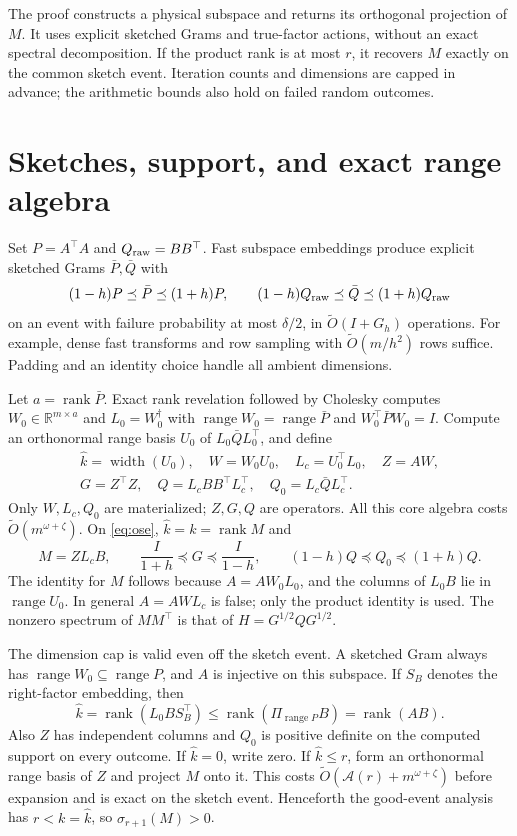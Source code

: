 \documentclass[11pt]{article}
\newcommand{\R}{\mathbb R}
\newcommand{\rank}{\operatorname{rank}}
\newcommand{\range}{\operatorname{range}}
\newcommand{\tO}{\widetilde O}
\newcommand{\Ac}{\mathcal A}
\begin{document}
The proof constructs a physical subspace and returns its orthogonal
projection of \(M\). It uses explicit sketched Grams and true-factor
actions, without an exact spectral decomposition. If the product rank is at most \(r\),
it recovers \(M\) exactly on the common sketch event. Iteration counts
and dimensions are capped in advance; the arithmetic bounds also hold
on failed random outcomes.

\section{Sketches, support, and exact range algebra}
Set \(P=A^\top A\) and \(Q_{\rm raw}=BB^\top\). Fast subspace embeddings
\cite{cnw} produce explicit sketched Grams \(\bar P,\bar Q\) with
\begin{equation}\label{eq:ose}
 (1-h)P\preceq\bar P\preceq(1+h)P,\qquad
 (1-h)Q_{\rm raw}\preceq\bar Q\preceq(1+h)Q_{\rm raw}
\end{equation}
on an event with failure probability at most \(\delta/2\), in
\(\tO(I+G_h)\) operations. For example, dense fast transforms and
row sampling with \(\tO(m/h^2)\) rows suffice. Padding and an identity
choice handle all ambient dimensions.

Let \(a=\rank\bar P\). Exact rank revelation followed by Cholesky
computes \(W_0\in\R^{m\times a}\) and \(L_0=W_0^\dagger\) with
\(\range W_0=\range\bar P\) and \(W_0^\top\bar P W_0=I\).
Compute an orthonormal range basis \(U_0\) of
\(L_0\bar QL_0^\top\), and define
\begin{gather*}
 \widehat k=\operatorname{width}(U_0),\quad
 W=W_0U_0,\quad L_c=U_0^\top L_0,\quad Z=AW,\\
 G=Z^\top Z,\quad Q=L_cBB^\top L_c^\top,\quad Q_0=L_c\bar QL_c^\top.
\end{gather*}
Only \(W,L_c,Q_0\) are materialized; \(Z,G,Q\) are operators.
All this core algebra costs \(\tO(m^{\omega+\zeta})\).
On \eqref{eq:ose}, \(\widehat k=k=\rank M\) and
\begin{equation}\label{eq:support}
 M=ZL_cB,\qquad
 \frac{I}{1+h}\preceq G\preceq\frac{I}{1-h},\qquad
 (1-h)Q\preceq Q_0\preceq(1+h)Q.
\end{equation}
The identity for \(M\) follows because \(A=AW_0L_0\), and the columns
of \(L_0B\) lie in \(\range U_0\). In general \(A=AWL_c\) is false;
only the product identity is used. The nonzero spectrum of \(MM^\top\)
is that of \(H=G^{1/2}QG^{1/2}\).

The dimension cap is valid even off the sketch event. A sketched Gram
always has \(\range W_0\subseteq\range P\), and \(A\) is injective
on this subspace. If \(S_B\) denotes the right-factor embedding, then
\[
 \widehat k=\rank(L_0B S_B^\top)
       \leq\rank(\Pi_{\range P}B)=\rank(AB).
\]
Also \(Z\) has independent columns and \(Q_0\) is positive definite
on the computed support on every outcome. If \(\widehat k=0\), write
zero. If \(\widehat k\leq r\), form an orthonormal range basis of \(Z\)
and project \(M\) onto it. This costs \(\tO(\Ac(r)+m^{\omega+\zeta})\)
before expansion and is exact on the sketch event. Henceforth the good-event
analysis has \(r<k=\widehat k\), so \(\sigma_{r+1}(M)>0\).
\end{document}
